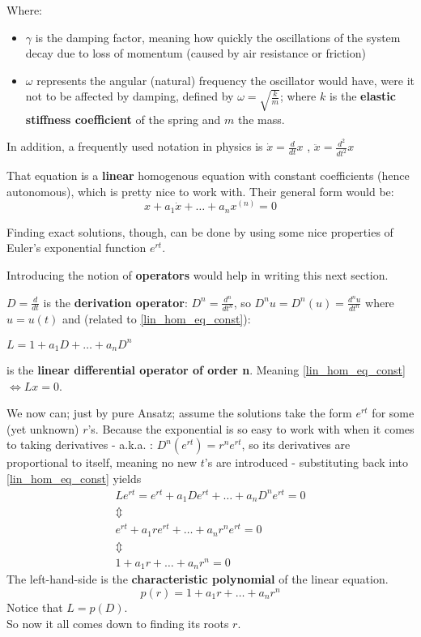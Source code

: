 Where:
\begin{itemize}
  \item $\gamma$ is the damping factor, meaning how quickly the oscillations of the system decay due to loss of momentum (caused by air resistance or friction)

  \item $\omega$ represents the angular (natural) frequency the oscillator would have, were it not to be affected by damping, defined by
    $\omega = \sqrt{\frac{k}{m}}$; where $k$ is the \textbf{elastic stiffness coefficient} of the spring and $m$ the mass.
\end{itemize}

In addition, a frequently used notation in physics is
$\dot{x} = \frac{d}{dt}x$ , $\ddot{x}=\frac{d^2}{dt^2}x$

That equation is a \textbf{linear} homogenous equation with constant coefficients (hence autonomous), which is pretty nice to work with. Their general form would be:
\begin{equation}\label{lin_hom_eq_const}
  x + a_1\dot{x}+ \dots +a_{n} x^{(n)} = 0
\end{equation}

Finding exact solutions, though, can be done by using some nice properties of Euler's exponential function $e^{rt}$.

Introducing the notion of \textbf{operators} would help in writing this next section.

\begin{definition}
  $D = \frac{d}{dt}$ is the \textbf{derivation operator}:
  $D^n = \frac{d^n}{dt^n}$, so $D^nu = D^n(u) =\frac{d^nu}{dt^n}$ where $u=u(t)$ and (related to \ref{lin_hom_eq_const}): \par
  \hspace{20pt} $L = 1 + a_1D + \dots + a_nD^n$ \par
  \hspace{20pt} is the \textbf{linear differential operator of order n}. Meaning \ref{lin_hom_eq_const} $\iff Lx=0$.
\end{definition}

We now can; just by pure Ansatz; assume the solutions take the form $e^{rt}$ for some (yet unknown) $r$'s. Because the exponential is so easy to work with when it comes to taking derivatives - a.k.a. : $D^n(e^{rt})=r^ne^{rt}$, so its derivatives are proportional to itself, meaning no new $t$'s are introduced - substituting back into \ref{lin_hom_eq_const} yields
\begin{gather*}
  Le^{rt} = e^{rt} + a_1 De^{rt} + \dots +a_{n} D^ne^{rt} = 0      \\
  \Updownarrow \\
  e^{rt}+a_1re^{rt} + \dots + a_nr^ne^{rt} =0 \\
  \Updownarrow \\
  1 + a_1r + \dots + a_nr^n =0
\end{gather*}
The left-hand-side is the \textbf{characteristic polynomial} of the linear equation.
\[
  p(r) = 1 + a_1r + \dots + a_nr^n
\]
Notice that $L = p(D)$. \\
So now it all comes down to finding its roots $r$.

